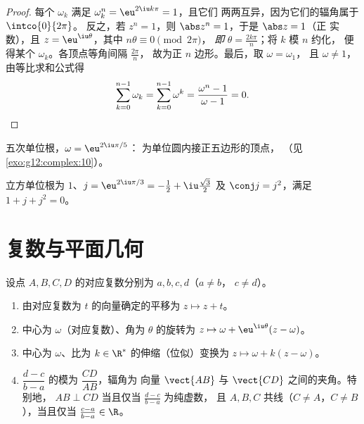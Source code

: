 \begin{proof}
每个 $\omega_k$ 满足 $\omega_k^n = \eu^{2\iu k\pi} = 1$，且它们
两两互异，因为它们的辐角属于 $\intco{0}{2\pi}$。
反之，若 $z^n = 1$，则 $\abs z^n = 1$，于是 $\abs z = 1$（正
实数），且 $z = \eu^{\iu\theta}$，其中 $n\theta \equiv 0 \pmod{2\pi}$，
\emph{即} $\theta = \frac{2k\pi}{n}$；将 $k$ 模 $n$ 约化，
便得某个 $\omega_k$。各顶点等角间隔 $\frac{2\pi}{n}$，
故为正 $n$ 边形。最后，取 $\omega = \omega_1$，
且 $\omega \neq 1$，由等比求和公式得
\[
\sum_{k=0}^{n-1}\omega_k = \sum_{k=0}^{n-1}\omega^k
= \frac{\omega^n - 1}{\omega - 1} = 0 . \qedhere
\]
\end{proof}

\begin{omfigure}

{\small 五次单位根，$\omega = \eu^{2\iu\pi/5}$：
为单位圆内接正五边形的顶点，
（见\cref{exo:g12:complex:10}）。}
\end{omfigure}

\begin{example}
立方单位根为 $1$、$j = \eu^{2\iu\pi/3} =
-\frac12 + \iu\frac{\sqrt3}{2}$ 及 $\conj j = j^2$，满足
$1 + j + j^2 = 0$。
\end{example}

\section{复数与平面几何}

\begin{proposition}[几何对应]\label{prop:g12:complex:geometry}
设点 $A, B, C, D$ 的对应复数分别为 $a, b, c, d$（$a \neq b$，
$c \neq d$）。
\begin{enumerate}
  \item 由对应复数为 $t$ 的向量确定的平移为 $z \mapsto z + t$。
  \item 中心为 $\omega$（对应复数）、角为 $\theta$ 的旋转为
        $z \mapsto \omega + \eu^{\iu\theta}(z - \omega)$。
  \item 中心为 $\omega$、比为
        $k \in \R^*$ 的伸缩（位似）变换为 $z \mapsto \omega + k(z - \omega)$。
  \item $\dfrac{d - c}{b - a}$ 的模为 $\dfrac{CD}{AB}$，辐角为
        向量 $\vect{AB}$ 与 $\vect{CD}$ 之间的夹角。特别地，
        $AB \perp CD$ 当且仅当 $\frac{d-c}{b-a}$ 为纯虚数，
        且 $A, B, C$ 共线（$C \ne A$，$C\ne B$），当且仅当
        $\frac{c-a}{b-a} \in \R$。
\end{enumerate}
\end{proposition}

